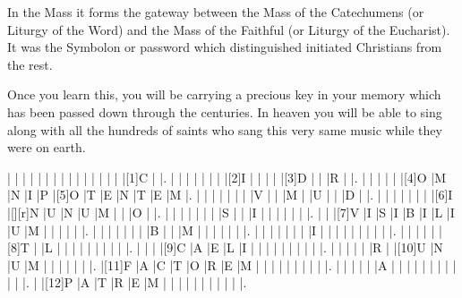 \documentclass[12pt,a4paper]{article}
\begin{document}
In the Mass it forms the gateway between the Mass of the Catechumens (or Liturgy of the Word) and the Mass of the Faithful (or Liturgy of the Eucharist).  It was the Symbolon or password which distinguished initiated Christians from the rest.

Once you learn this, you will be carrying a precious key in your memory which has been passed down through the centuries.  In heaven you will be able to sing along with all the hundreds of saints who sang this very same music while they were on earth.

\PuzzleSolution 


\begin{Puzzle}{17}{15}
|{} |{} |{} |{} |{} |{} |{} |{} |{} |{} |{} |{} |{} |{} |{} |[1]C |{} |.
|{} |{} |{} |{} |{} |{} |{} |[2]I |{} |{} |{} |{} |[3]D |{} |{} |R |{} |.
|{} |{} |{} |{} |{} |[4]O |M |N |I |P |[5]O |T |E |N |T |E |M |.
|{} |{} |{} |{} |{} |{} |{} |V |{} |{} |M |{} |U |{} |{} |D |{} |.
|{} |{} |{} |{} |{} |{} |{} |[6]I |[][r]N |U |N |U |M |{} |{} |O |{} |.
|{} |{} |{} |{} |{} |{} |{} |S |{} |{} |I |{} |{} |{} |{} |{} |{} |.
|{} |{} |[7]V |I |S |I |B |I |L |I |U |M |{} |{} |{} |{} |{} |.
|{} |{} |{} |{} |{} |{} |{} |B |{} |{} |M |{} |{} |{} |{} |{} |{} |.
|{} |{} |{} |{} |{} |{} |{} |I |{} |{} |{} |{} |{} |{} |{} |{} |{} |.
|{} |{} |{} |{} |{} |[8]T |{} |L |{} |{} |{} |{} |{} |{} |{} |{} |{} |.
|{} |{} |{} |[9]C |A |E |L |I |{} |{} |{} |{} |{} |{} |{} |{} |{} |.
|{} |{} |{} |{} |{} |R |{} |[10]U |N |U |M |{} |{} |{} |{} |{} |{} |.
|[11]F |A |C |T |O |R |E |M |{} |{} |{} |{} |{} |{} |{} |{} |{} |.
|{} |{} |{} |{} |{} |A |{} |{} |{} |{} |{} |{} |{} |{} |{} |{} |{} |.
|{} |[12]P |A |T |R |E |M |{} |{} |{} |{} |{} |{} |{} |{} |{} |{} |.
\end{Puzzle}
\end{document}
